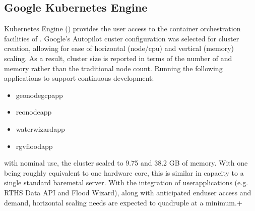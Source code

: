 \documentclass[letterpaper,12pt,english,openany,oneside]{sphinxmanual}
\begin{document}
\subsection{Google Kubernetes Engine}
\label{\detokenize{euidev/infrastructure/index:google-kubernetes-engine}}
\sphinxAtStartPar
{} Kubernetes Engine () provides the user access to the container orchestration facilities of . Google’s Autopilot custer configuration was selected for cluster creation, allowing for ease of horizontal (node/cpu) and vertical (memory) scaling. As a result, cluster size is reported in terms of the number of  and memory rather than the traditional node count. Running the following applications to support continuous development:
\begin{itemize}
\item {} 
\sphinxAtStartPar
geonodegcp\sphinxhyphen{}app

\item {} 
\sphinxAtStartPar
reonode\sphinxhyphen{}app

\item {} 
\sphinxAtStartPar
waterwizard\sphinxhyphen{}app

\item {} 
\sphinxAtStartPar
rgvflood\sphinxhyphen{}app

\end{itemize}

\sphinxAtStartPar
with nominal use, the cluster scaled to 9.75  and 38.2 GB of memory. With one  being roughly equivalent to one hardware core, this is similar in capacity to a single standard bare\sphinxhyphen{}metal server. With the integration of user\sphinxhyphen{}applications (e.g. RTHS Data API and Flood Wizard), along with anticipated end\sphinxhyphen{}user access and demand, horizontal scaling needs are expected to quadruple at a minimum.+
\end{document}
